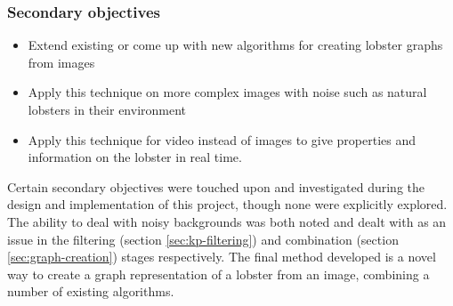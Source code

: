 \subsubsection{Secondary objectives}
\begin{itemize}
\item Extend existing or come up with new algorithms for creating lobster graphs from images
\item Apply this technique on more complex images with noise such as natural lobsters in their environment
\item Apply this technique for video instead of images to give properties and information on the lobster in real time. 
\end{itemize}
Certain secondary objectives were touched upon and investigated during the design and implementation of this project, though none were explicitly explored. The ability to deal with noisy backgrounds was both noted and dealt with as an issue in the filtering (section \ref{sec:kp-filtering}) and combination (section \ref{sec:graph-creation}) stages respectively. The final method developed is a novel way to create a graph representation of a lobster from an image, combining a number of existing algorithms. 


